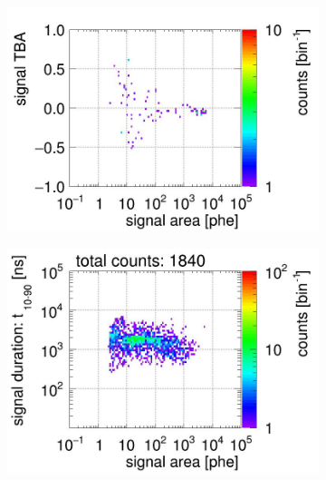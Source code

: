 \begin{landscape}
\begin{figure}[!p]
\begin{subfigure}[t]{0.33\textwidth}
		\includegraphics[width=\figurewidth,clip,trim={0 0 0 40}]{Figures/GasTest/CutsValid/res64767/tbapaX11Vecfig64767.jpg}
		\caption{}
		\label{fig:signal selection 11}
	\end{subfigure}
	\begin{subfigure}[t]{0.33\textwidth}
		\centering
		\includegraphics[width=\figurewidth,clip,trim={0 98 0 0}]{Figures/GasTest/CutsValid/res64767/pdpa12Vecfig64767.jpg}

\end{subfigure}
\end{figure}
\end{landscape}

